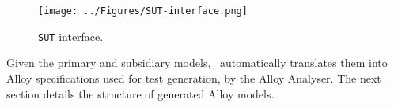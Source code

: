 \begin{figure}[h]
\centering
\texttt{[image: ../Figures/SUT-interface.png]}
\caption{\texttt{SUT} interface.}
\label{fig:SUT-interface}
\end{figure}

Given the primary and subsidiary models, \this~automatically  translates them into Alloy specifications used for test generation, by the Alloy Analyser. The next section details the structure of generated Alloy models.